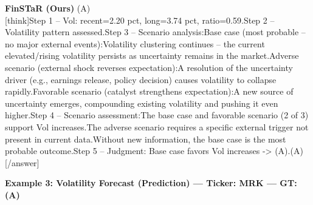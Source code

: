 \begin{minipage}[t]{0.41\textwidth}
\colorbox{green!10}{\parbox{\dimexpr\textwidth-2\fboxsep}{
\textbf{FinSTaR (Ours)} \textcolor{green!50!black}{(A)} \\[2pt]
\tiny
[think]\newline Step 1 -- Vol: recent=2.20 pct, long=3.74 pct, ratio=0.59.\newline Step 2 -- Volatility pattern assessed.\newline Step 3 -- Scenario analysis:\newline   Base case (most probable -- no major external events):\newline     Volatility clustering continues -- the current elevated/rising volatility persists as uncertainty remains in the market.\newline   Adverse scenario (external shock reverses expectation):\newline     A resolution of the uncertainty driver (e.g., earnings release, policy decision) causes volatility to collapse rapidly.\newline   Favorable scenario (catalyst strengthens expectation):\newline     A new source of uncertainty emerges, compounding existing volatility and pushing it even higher.\newline Step 4 -- Scenario assessment:\newline   The base case and favorable scenario (2 of 3) support Vol increases.\newline   The adverse scenario requires a specific external trigger not present in current data.\newline   Without new information, the base case is the most probable outcome.\newline Step 5 -- Judgment: Base case favors Vol increases -> (A).\newline [/think]\newline [answer](A)[/answer]
}}
\end{minipage}
\vspace{8pt}


\noindent
\textbf{Example 3: Volatility Forecast (Prediction) --- Ticker: MRK --- GT: (A)}
\vspace{2pt}

